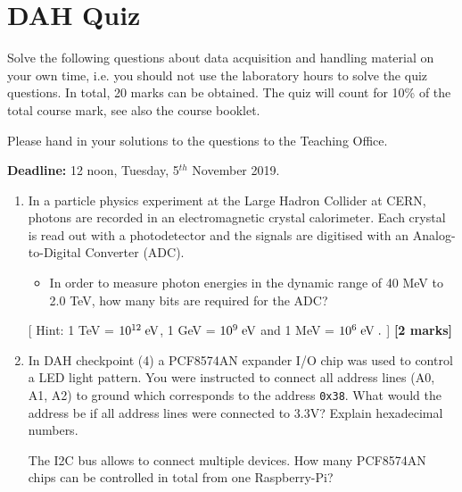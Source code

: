 \chapter{DAH Quiz}
\label{sec:quiz}

Solve the following questions about data acquisition and handling material on your own time,
i.e. you should not use the laboratory hours to solve the quiz questions. 
In total, 20 marks can be obtained.
The quiz will count for 10\% of the total course mark, see also the course booklet. 

Please hand in your solutions to the questions to the Teaching Office.

{\bf Deadline:} 12 noon, Tuesday, 5$^{th}$ November 2019.

\begin{enumerate}

\item  In a particle physics experiment at the Large Hadron Collider at CERN, photons  are recorded in an electromagnetic crystal calorimeter. Each crystal is read out with a photodetector and the signals
are  digitised with an Analog-to-Digital Converter (ADC).
%
\begin{itemize}
\item In order to measure photon  energies  in  the dynamic range of 40 MeV to  2.0 TeV,
how many bits are required for the ADC? 
\end{itemize}
[ Hint: 1 TeV = $10^{12}\; \rm eV$, 1 GeV = $10^9\; \rm eV$ and 1 MeV = $10^6\; \rm eV\; .$ ]
%
\hfill {\bf [2 marks]}\\

\item In DAH checkpoint (4) a PCF8574AN expander I/O chip was used to control a LED light pattern.  You were instructed to connect all address lines (A0, A1, A2) to ground which corresponds to the address {\tt 0x38}. What would the address be if all address lines were connected to 3.3V?
Explain hexadecimal numbers. 

The I2C bus allows to connect multiple devices. How many PCF8574AN chips can be controlled in total from one Raspberry-Pi?


\end{enumerate}

